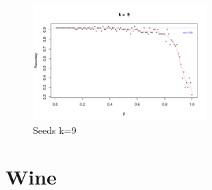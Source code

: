 \documentclass{article}
\begin{document}
\begin{figure}
 \centering
 \includegraphics[width=0.6\textwidth]{./figures/Seeds_k9.pdf}
 \caption{Seeds k=9}
 \label{fig:Seeds9}
\end{figure}

\FloatBarrier
\section{Wine}
\end{document}
